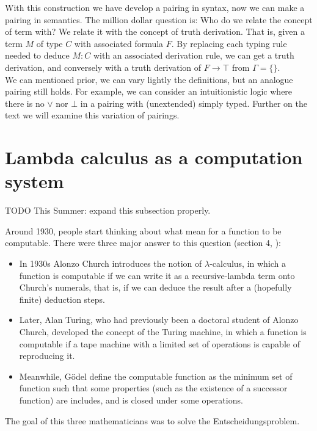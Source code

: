 With this construction we have develop a pairing in syntax,  now we can make a pairing in semantics. The million dollar question is: Who do we relate the concept of term with? We relate it with the concept of truth derivation. That is, given a term $M$  of type $C$ with associated formula $F$. By replacing each typing rule needed to deduce $M:C$  with an associated derivation rule, we can get a truth derivation, and conversely with a truth derivation of $F\to \top$ from $\Gamma=\{\}$.\\

We can mentioned prior, we can vary lightly the definitions, but an analogue pairing still holds. For example, we can consider an intuitionistic logic where there is no $\lor$ nor $\bot$ in a pairing with (unextended) simply typed. Further on the text we will examine this variation of pairings.

\section{Lambda calculus as a computation system}
{TODO This Summer: expand this subsection properly.}

\begin{itemize}

\end{itemize}

Around 1930, people start thinking about what mean for a function to be computable. There were three major answer to this question (section 4, \cite{cardone2006history}):
\begin{itemize}
\item In 1930s Alonzo Church introduces the notion of $\lambda$-calculus, in which a function is computable if we can write it as a recursive-lambda term onto Church's numerals, that is, if we can deduce the result after a (hopefully finite) deduction steps.
\item Later, Alan Turing, who had previously been a doctoral student of Alonzo Church, developed the concept of the Turing machine, in which a function is computable if a tape machine with a limited set of operations is capable of reproducing it.
\item Meanwhile, Gödel define the computable function as the minimum set of function such that some properties (such as the existence of a successor function) are includes, and is closed under some operations. 
\end{itemize}

The goal of this three mathematicians was to solve the Entscheidungsproblem\cite{hilbert1999principles}.\\

